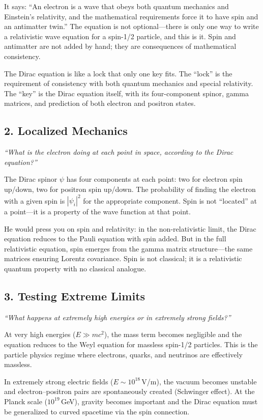 It says: ``An electron is a wave that obeys both quantum mechanics and Einstein's relativity, and the mathematical requirements force it to have spin and an antimatter twin.'' The equation is not optional---there is only one way to write a relativistic wave equation for a spin-1/2 particle, and this is it. Spin and antimatter are not added by hand; they are consequences of mathematical consistency.

The Dirac equation is like a lock that only one key fits. The ``lock'' is the requirement of consistency with both quantum mechanics and special relativity. The ``key'' is the Dirac equation itself, with its four-component spinor, gamma matrices, and prediction of both electron and positron states.

\subsection*{2. Localized Mechanics}
\textit{``What is the electron doing at each point in space, according to the Dirac equation?''}

The Dirac spinor $\psi$ has four components at each point: two for electron spin up/down, two for positron spin up/down. The probability of finding the electron with a given spin is $|\psi_i|^2$ for the appropriate component. Spin is not ``located'' at a point---it is a property of the wave function at that point.

He would press you on spin and relativity: in the non-relativistic limit, the Dirac equation reduces to the Pauli equation with spin added. But in the full relativistic equation, spin emerges from the gamma matrix structure---the same matrices ensuring Lorentz covariance. Spin is not classical; it is a relativistic quantum property with no classical analogue.

\subsection*{3. Testing Extreme Limits}
\textit{``What happens at extremely high energies or in extremely strong fields?''}

At very high energies ($E \gg mc^2$), the mass term becomes negligible and the equation reduces to the Weyl equation for massless spin-1/2 particles. This is the particle physics regime where electrons, quarks, and neutrinos are effectively massless.

In extremely strong electric fields ($E \sim 10^{18}$\,V/m), the vacuum becomes unstable and electron--positron pairs are spontaneously created (Schwinger effect). At the Planck scale ($10^{19}$\,GeV), gravity becomes important and the Dirac equation must be generalized to curved spacetime via the spin connection.

